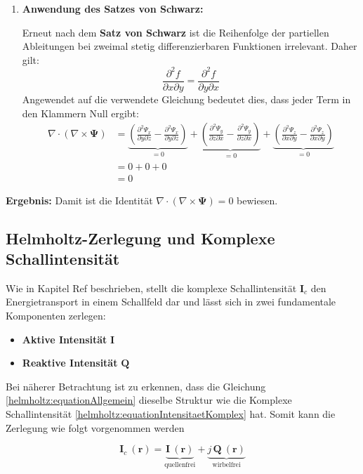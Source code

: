 \begin{enumerate}
    \item \textbf{Anwendung des Satzes von Schwarz:}
    
    Erneut nach dem \textbf{Satz von Schwarz} ist die Reihenfolge der partiellen Ableitungen bei zweimal stetig differenzierbaren Funktionen irrelevant. Daher gilt:
    \[
    \frac{\partial^2 f}{\partial x \partial y} = \frac{\partial^2 f}{\partial y \partial x}
    \]
    Angewendet auf die verwendete Gleichung bedeutet dies, dass jeder Term in den Klammern Null ergibt:
    \begin{align*}
    \nabla \cdot (\nabla \times \mathbf{\Psi}) &= \underbrace{\left( \frac{\partial^2 \Psi_x}{\partial y \partial z} - \frac{\partial^2 \Psi_x}{\partial y \partial z} \right)}_{=0} + \underbrace{\left( \frac{\partial^2 \Psi_y}{\partial z \partial x} - \frac{\partial^2 \Psi_y}{\partial z \partial x} \right)}_{=0} + \underbrace{\left( \frac{\partial^2 \Psi_z}{\partial x \partial y} - \frac{\partial^2 \Psi_z}{\partial x \partial y} \right)}_{=0} \\[1em]
    &= 0 + 0 + 0 \\[1em]
    &= 0
    \end{align*}

\end{enumerate}

\textbf{Ergebnis:} Damit ist die Identität $\nabla \cdot (\nabla \times \mathbf{\Psi}) = 0$ bewiesen.

\subsection{Helmholtz-Zerlegung und Komplexe Schallintensität}
Wie in Kapitel Ref beschrieben,  stellt die komplexe Schallintensität $\mathbf{I}_c$ den Energietransport in einem Schallfeld dar und lässt sich in zwei fundamentale Komponenten zerlegen:

\begin{itemize}
\item \textbf{Aktive Intensität} $\mathbf{I}$
\item \textbf{Reaktive Intensität} $\mathbf{Q}$
\end{itemize}

Bei näherer Betrachtung ist zu erkennen, dass die Gleichung \eqref{helmholtz:equationAllgemein} dieselbe Struktur wie die Komplexe Schallintensität \eqref{helmholtz:equationIntensitaetKomplex} hat. Somit kann die Zerlegung wie folgt vorgenommen werden

\begin{equation}
\mathbf{I}_c ~(\mathbf{r}) = \underbrace{\mathbf{I}~(\mathbf{r})}_{\text{quellenfrei}} + \underbrace{j\,\mathbf{Q}~(\mathbf{r})}_{\text{wirbelfrei}}
\label{helmholtz:KomplexeIntensitaet_Zerlegung}
\end{equation}

